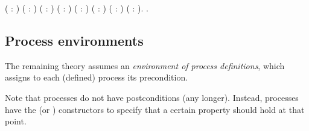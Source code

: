 \documentclass[12pt]{report}
\begin{document}
\begin{coqdoccode}
\coqdocemptyline
\coqdocnoindent
{}  \coqdoceol
\coqdocindent{1.00em}
( : )\coqdoceol
\coqdocindent{1.00em}
( :  )\coqdoceol
\coqdocindent{1.00em}
( :   )\coqdoceol
\coqdocindent{1.00em}
( :  )\coqdoceol
\coqdocindent{1.00em}
( :    )\coqdoceol
\coqdocindent{1.00em}
( :     )\coqdoceol
\coqdocindent{1.00em}
( :     )\coqdoceol
\coqdocindent{1.00em}
( :        ).\coqdoceol
\coqdocemptyline
\coqdocnoindent
{}        .\coqdoceol
\coqdocemptyline
\end{coqdoccode}
\subsection{Process environments}



 The remaining theory assumes an \textit{environment of process definitions},
    which assigns to each (defined) process its precondition. 

 Note that processes do not have postconditions (any longer).
    Instead, processes have the  (or ) constructors
    to specify that a certain property should hold at that point. 
\end{document}
